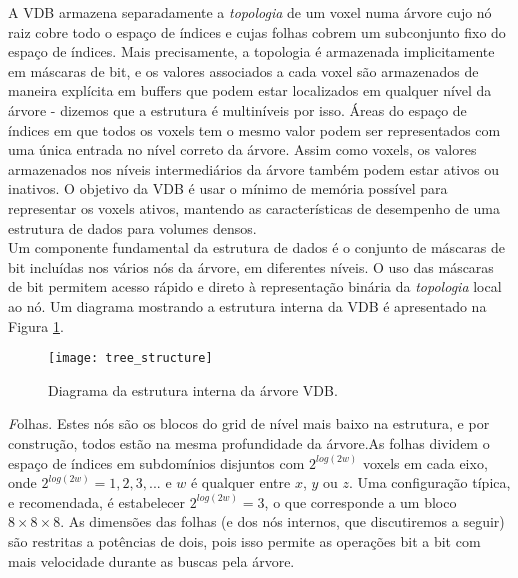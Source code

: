 A VDB armazena separadamente a {\it topologia} de um voxel numa árvore cujo nó raiz cobre todo o espaço de índices e cujas folhas cobrem um subconjunto fixo do espaço de índices. Mais precisamente, a topologia é armazenada implicitamente em máscaras de bit, e os valores associados a cada voxel são armazenados de maneira explícita em buffers que podem estar localizados em qualquer nível da árvore - dizemos que a estrutura é multiníveis por isso. Áreas do espaço de índices em que todos os voxels tem o mesmo valor podem ser representados com uma única entrada no nível correto da árvore. Assim como voxels, os valores armazenados nos níveis intermediários da árvore também podem estar ativos ou inativos. O objetivo da VDB é usar o mínimo de memória possível para representar os voxels ativos, mantendo as características de desempenho de uma estrutura de dados para volumes densos. \\

Um componente fundamental da estrutura de dados é o conjunto de máscaras de bit incluídas nos vários nós da árvore, em diferentes níveis. O uso das máscaras de bit permitem acesso rápido e direto à representação binária da {\it topologia} local ao nó.  Um diagrama mostrando a estrutura interna da VDB é apresentado na Figura \ref{treeStructure}. \\

\begin{figure}[!htb]
\center
\texttt{[image: tree\_structure]}
\caption{Diagrama da estrutura interna da árvore VDB.}
\label{treeStructure}
\end{figure}

{\emph Folhas}. Estes nós são os blocos do grid de nível mais baixo na estrutura, e por construção, todos estão na mesma profundidade da árvore.As folhas dividem o espaço de índices em subdomínios disjuntos com $2^{log(2w)}$ voxels em cada eixo, onde $2^{log(2w)} = 1, 2, 3, ...$ e $w$ é qualquer entre $x$, $y$ ou $z$. Uma configuração típica, e recomendada, é estabelecer $2^{log(2w)} = 3$, o que corresponde a um bloco $8 \times 8 \times 8$. As dimensões das folhas (e dos nós internos, que discutiremos a seguir) são restritas a potências de dois, pois isso permite as operações bit a bit com mais velocidade durante as buscas pela árvore.



